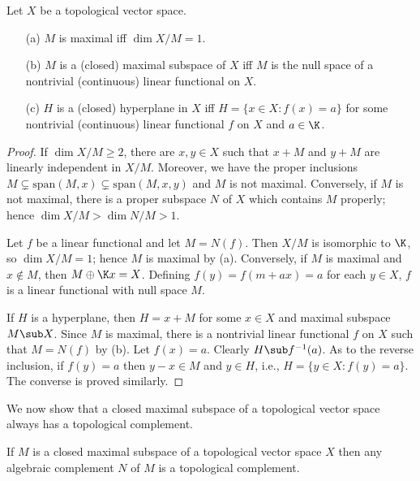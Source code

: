 \begin{proposition}\label{TVS maximal subspace iff}
Let $X$ be a topological vector space.
\begin{itemize}
\item[(a)] $M$ is maximal iff $\dim X/M=1$.
\item[(b)] $M$ is a (closed) maximal subspace of $X$ iff $M$ is the null space of a nontrivial (continuous) linear functional on $X$.
\item[(c)] $H$ is a (closed) hyperplane in $X$ iff $H=\{x\in X:f(x)=a\}$ for some nontrivial (continuous) linear functional $f$ on $X$ and $a\in\K$.
\end{itemize}
\end{proposition}
\begin{proof}
If $\dim X/M\geq 2$, there are $x,y\in X$ such that $x+M$ and $y+M$ are linearly independent in $X/M$. Moreover, we have the proper inclusions $M\subsetneq\mathrm{span}(M,x)\subsetneq\mathrm{span}(M,x,y)$ and $M$ is not maximal. Conversely, if $M$ is not maximal, there is a proper subspace $N$ of $X$ which contains $M$ properly; hence $\dim X/M>\dim N/M>1$.\par
Let $f$ be a linear functional and let $M=N(f)$. Then $X/M$ is isomorphic to $\K$, so $\dim X/M=1$; hence $M$ is maximal by (a). Conversely, if $M$ is maximal and $x\notin M$, then $M\oplus\K x=X$. Defining $f(y)=f(m+ax)=a$ for each $y\in X$, $f$ is a linear functional with null space $M$.\par
If $H$ is a hyperplane, then $H=x+M$ for some $x\in X$ and maximal subspace $M\sub X$. Since $M$ is maximal, there is a nontrivial linear functional $f$ on $X$ such that $M=N(f)$ by (b). Let $f(x)=a$. Clearly $H\sub f^{-1}(a)$. As to the reverse inclusion, if $f(y)=a$ then $y-x\in M$ and $y\in H$, i.e., $H=\{y\in X:f(y)=a\}$. The converse is proved similarly.
\end{proof}
We now show that a closed maximal subspace of a topological vector space always has a topological complement.
\begin{proposition}\label{TVS closed maximal subspace complemented}
If $M$ is a closed maximal subspace of a topological vector space $X$ then any algebraic complement $N$ of $M$ is a topological complement.
\end{proposition}

